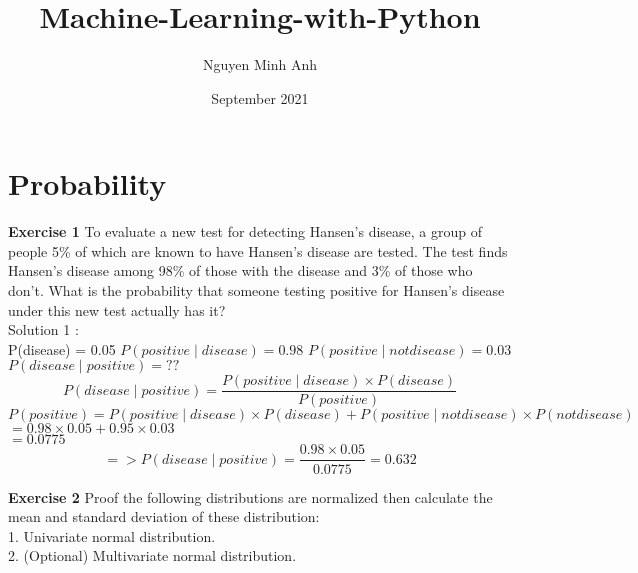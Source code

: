 \documentclass{article}
\title{Machine-Learning-with-Python}
\author{Nguyen Minh Anh}
\date{September 2021}
\begin{document}
\maketitle

\section{Probability}

\textbf{Exercise 1}
To evaluate a new test for detecting Hansen’s disease, a group of people 5\% of which are known to have Hansen’s disease are tested. The test finds Hansen’s disease among 98\% of those with the disease and 3\% of those who don’t. What is the probability that someone testing positive for Hansen’s disease under this new test actually has it? \\
    
Solution 1 : \\
P(disease) = 0.05 \newline
$P(positive \mid disease) = 0.98$ \newline
$P(positive \mid not disease) = 0.03$ \newline
$P(disease \mid positive) = ??$ \\
$$ P(disease \mid positive) = \frac{P(positive \mid disease) \times P(disease)}{P(positive)} $$
$P(positive) =  P(positive \mid disease) \times P(disease) + P(positive \mid not disease) \times P(not disease)$ \\
$            = 0.98 \times 0.05 + 0.95 \times 0.03$ \\
$            = 0.0775$
$$ => P(disease \mid positive) = \frac{0.98 \times 0.05}{0.0775} = 0.632$$


\textbf{Exercise 2} Proof the following distributions are normalized then calculate the mean and standard deviation of these distribution:\\
1. Univariate normal distribution.\\
2. (Optional) Multivariate normal distribution.\\
\end{document}
